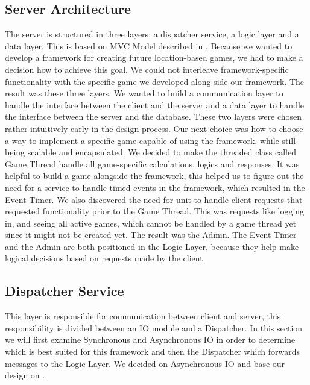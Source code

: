 \subsection{Server Architecture}
\label{sec:server}

The server is structured in three layers: a dispatcher service, a logic layer and a data layer. This is based on MVC Model described in . Because we wanted to develop a framework for creating future location-based games, we had to make a decision how to achieve this goal. We could not interleave framework-specific functionality with the specific game we developed along side our framework. The result was these three layers. We wanted to build a communication layer to handle the interface between the client and the server and a data layer to handle the interface between the server and the database. These two layers were chosen rather intuitively early in the design process. Our next choice was how to choose a way to implement a specific game capable of using the framework, while still being scalable and encapsulated. We decided to make the threaded class called Game Thread handle all game-specific calculations, logics and responses. 
It was helpful to build a game alongside the framework, this helped us to figure out the need for a service to handle timed events in the framework, which resulted in the Event Timer. We also discovered the need for unit to handle client requests that requested functionality prior to the Game Thread. This was requests like logging in, and seeing all active games, which cannot be handled by a game thread yet since it might not be created yet. The result was the Admin. The Event Timer and the Admin are both positioned in the Logic Layer, because they help make logical decisions based on requests made by the client. 



\subsection{Dispatcher Service}
This layer is responsible for communication between client and server, this responsibility is divided between an IO module and a Dispatcher. In this section we will first examine Synchronous and Asynchronous IO in order to determine which is best suited for this framework and then the Dispatcher which forwards messages to the Logic Layer. We decided on Asynchronous IO and base our design on \cite{subsubsec:sync}.	 %

